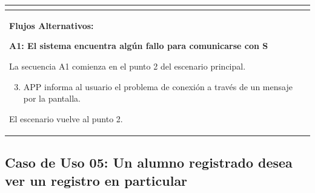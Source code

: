 \begin{longtable}{|l|p{5.5cm}|l|p{2cm}|l|p{1.9cm}|}
{    } \\ \hline

    \multicolumn{6}{|p{15cm}|}{ \textbf{Flujos Alternativos: }
    
    \textbf{A1: El sistema encuentra algún fallo para comunicarse con S}
    
    La secuencia A1 comienza en el punto 2 del escenario principal.
    \begin{enumerate}
        \setcounter{enumi}{2}
        \item APP informa al usuario el problema de conexión a través de un mensaje por la pantalla.
    \end{enumerate}

    El escenario vuelve al punto 2.

    } \\ \hline

\end{longtable}


\subsection{Caso de Uso 05: Un alumno registrado desea ver un registro en particular}

